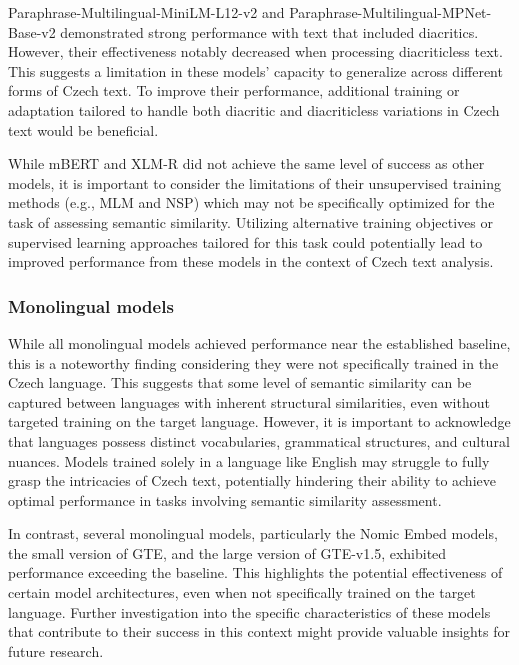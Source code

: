 Paraphrase-Multilingual-MiniLM-L12-v2 and Paraphrase-Multilingual-MPNet-Base-v2 demonstrated strong performance with text that included diacritics.
However, their effectiveness notably decreased when processing diacriticless text.
This suggests a limitation in these models' capacity to generalize across different forms of Czech text.
To improve their performance, additional training or adaptation tailored to handle both diacritic and diacriticless variations in Czech text would be beneficial.

While \ac{mBERT} and \ac{XLM-R} did not achieve the same level of success as other models, it is important to consider the limitations of their unsupervised training methods (e.g., \ac{MLM} and \ac{NSP}) which may not be specifically optimized for the task of assessing semantic similarity.
Utilizing alternative training objectives or supervised learning approaches tailored for this task could potentially lead to improved performance from these models in the context of Czech text analysis.

\FloatBarrier

\FloatBarrier

\subsubsection{Monolingual models}

While all monolingual models achieved performance near the established baseline, this is a noteworthy finding considering they were not specifically trained in the Czech language.
This suggests that some level of semantic similarity can be captured between languages with inherent structural similarities, even without targeted training on the target language.
However, it is important to acknowledge that languages possess distinct vocabularies, grammatical structures, and cultural nuances.
Models trained solely in a language like English may struggle to fully grasp the intricacies of Czech text, potentially hindering their ability to achieve optimal performance in tasks involving semantic similarity assessment.

In contrast, several monolingual models, particularly the Nomic Embed models, the small version of \ac{GTE}, and the large version of \ac{GTE}-v1.5, exhibited performance exceeding the baseline.
This highlights the potential effectiveness of certain model architectures, even when not specifically trained on the target language.
Further investigation into the specific characteristics of these models that contribute to their success in this context might provide valuable insights for future research.

